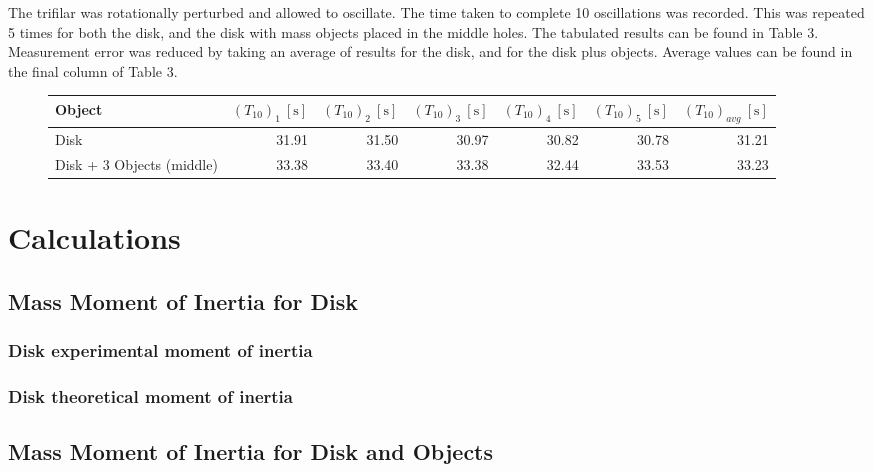 \documentclass[a4paper]{article}
\begin{document}
The trifilar was rotationally perturbed and allowed to oscillate. The time taken to complete 10 oscillations was recorded. This was repeated 5 times for both the disk, and the disk with mass objects placed in the middle holes. The tabulated results can be found in Table 3. Measurement error was reduced by taking an average of results for the disk, and for the disk plus objects. Average values can be found in the final column of Table 3. 

\vspace{0.5cm}

\begin{figure}[h]
	\centering
	\small
	\begin{tabular}{lrrrrrr}
		\toprule
		Object & $(T_{10})_1 \ [\si{\second}]$ & $(T_{10})_2 \ [\si{\second}]$ & $(T_{10})_3 \ [\si{\second}]$ & $(T_{10})_4 \ [\si{\second}]$ & $(T_{10})_5 \ [\si{\second}]$ & $(T_{10})_{avg} \ [\si{\second}]$ \\
		\midrule
		Disk & 31.91 & 31.50 & 30.97 & 30.82 & 30.78 & 31.21\\
		Disk + 3 Objects (middle) & 33.38 & 33.40 & 33.38 & 32.44 & 33.53 & 33.23 \\
		\bottomrule
	\end{tabular}
\end{figure}


\newpage

\section{Calculations}
\subsection{Mass Moment of Inertia for Disk}

\subsubsection{Disk experimental moment of inertia}
\subsubsection{Disk theoretical moment of inertia}

\subsection{Mass Moment of Inertia for Disk and Objects}
\end{document}
